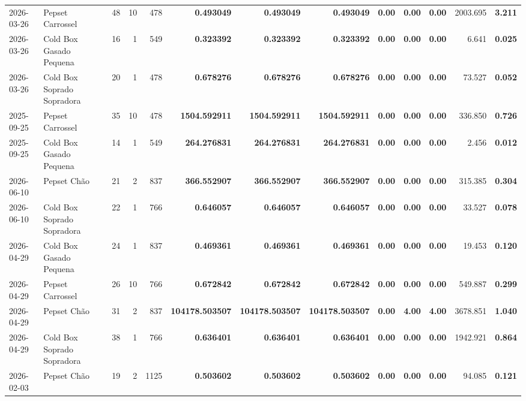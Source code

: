 {\begin{center}
{\begin{tabular}{@{}llrrrrrrrrrrr@{}}
2026-03-26 & Pepset Carrossel & 48 & 10 & 478 & \textbf{0.493049} & \textbf{0.493049} & \textbf{0.493049} & \textbf{0.00} & \textbf{0.00} & \textbf{0.00} & 2003.695 & \textbf{3.211} \\
2026-03-26 & Cold Box Gasado Pequena & 16 & 1 & 549 & \textbf{0.323392} & \textbf{0.323392} & \textbf{0.323392} & \textbf{0.00} & \textbf{0.00} & \textbf{0.00} & 6.641 & \textbf{0.025} \\
2026-03-26 & Cold Box Soprado Sopradora & 20 & 1 & 478 & \textbf{0.678276} & \textbf{0.678276} & \textbf{0.678276} & \textbf{0.00} & \textbf{0.00} & \textbf{0.00} & 73.527 & \textbf{0.052} \\
2025-09-25 & Pepset Carrossel & 35 & 10 & 478 & \textbf{1504.592911} & \textbf{1504.592911} & \textbf{1504.592911} & \textbf{0.00} & \textbf{0.00} & \textbf{0.00} & 336.850 & \textbf{0.726} \\
2025-09-25 & Cold Box Gasado Pequena & 14 & 1 & 549 & \textbf{264.276831} & \textbf{264.276831} & \textbf{264.276831} & \textbf{0.00} & \textbf{0.00} & \textbf{0.00} & 2.456 & \textbf{0.012} \\
2026-06-10 & Pepset Chão & 21 & 2 & 837 & \textbf{366.552907} & \textbf{366.552907} & \textbf{366.552907} & \textbf{0.00} & \textbf{0.00} & \textbf{0.00} & 315.385 & \textbf{0.304} \\
2026-06-10 & Cold Box Soprado Sopradora & 22 & 1 & 766 & \textbf{0.646057} & \textbf{0.646057} & \textbf{0.646057} & \textbf{0.00} & \textbf{0.00} & \textbf{0.00} & 33.527 & \textbf{0.078} \\
2026-04-29 & Cold Box Gasado Pequena & 24 & 1 & 837 & \textbf{0.469361} & \textbf{0.469361} & \textbf{0.469361} & \textbf{0.00} & \textbf{0.00} & \textbf{0.00} & 19.453 & \textbf{0.120} \\
2026-04-29 & Pepset Carrossel & 26 & 10 & 766 & \textbf{0.672842} & \textbf{0.672842} & \textbf{0.672842} & \textbf{0.00} & \textbf{0.00} & \textbf{0.00} & 549.887 & \textbf{0.299} \\
2026-04-29 & Pepset Chão & 31 & 2 & 837 & \textbf{104178.503507} & \textbf{104178.503507} & \textbf{104178.503507} & \textbf{0.00} & \textbf{4.00} & \textbf{4.00} & 3678.851 & \textbf{1.040} \\
2026-04-29 & Cold Box Soprado Sopradora & 38 & 1 & 766 & \textbf{0.636401} & \textbf{0.636401} & \textbf{0.636401} & \textbf{0.00} & \textbf{0.00} & \textbf{0.00} & 1942.921 & \textbf{0.864} \\
2026-02-03 & Pepset Chão & 19 & 2 & 1125 & \textbf{0.503602} & \textbf{0.503602} & \textbf{0.503602} & \textbf{0.00} & \textbf{0.00} & \textbf{0.00} & 94.085 & \textbf{0.121} \\

\end{tabular}}
\end{center}}
